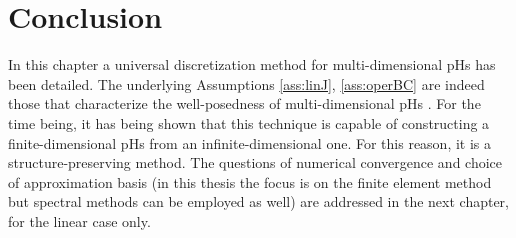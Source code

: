 \section{Conclusion}
In this chapter a universal discretization method for multi-dimensional pHs has been detailed. The underlying Assumptions \ref{ass:linJ}, \ref{ass:operBC} are indeed those that characterize the well-posedness of multi-dimensional pHs \cite{skrepek2019wellposedness}.  For the time being, it has being shown that this technique is capable of constructing a finite-dimensional pHs from an infinite-dimensional one. For this reason, it is a structure-preserving method. The questions of numerical convergence and choice of approximation basis (in this thesis the focus is on the finite element method but  spectral methods can be employed as well) are addressed in the next chapter, for the linear case only.



